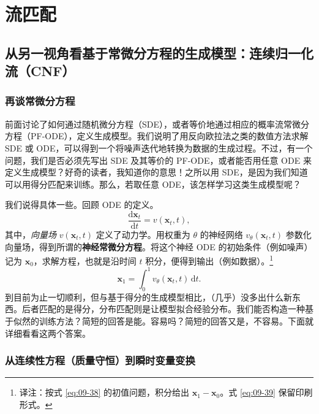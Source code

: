 \section{流匹配}
\label{sec:09-04}

\subsection[从常微分方程看连续归一化流]{从另一视角看基于常微分方程的生成模型：连续归一化流（CNF）}

\subsubsection{再谈常微分方程}

前面讨论了如何通过随机微分方程（SDE），或者等价地通过相应的概率流常微分方程（PF-ODE），定义生成模型。我们说明了用反向欧拉法之类的数值方法求解 SDE 或 ODE，可以得到一个将噪声迭代地转换为数据的生成过程。不过，有一个问题，我们是否必须先写出 SDE 及其等价的 PF-ODE，或者能否用任意 ODE 来定义生成模型？好奇的读者，我知道你的意思！之所以用 SDE，是因为我们知道可以用得分匹配来训练。那么，若取任意 ODE，该怎样学习这类生成模型呢？

我们说得具体一些。回顾 ODE 的定义。
\begin{equation}
  \frac{\mathrm d\mathbf x_t}{\mathrm dt}=v(\mathbf x_t,t),
  \tag{9.38}\label{eq:09-38}
\end{equation}
其中，\emph{向量场} $v(\mathbf x_t,t)$ 定义了动力学。用权重为 $\theta$ 的神经网络 $v_\theta(\mathbf x_t,t)$ 参数化向量场，得到所谓的\textbf{神经常微分方程}。将这个神经 ODE 的初始条件（例如噪声）记为 $\mathbf x_0$，求解方程，也就是沿时间 $t$ 积分，便得到输出（例如数据）。\footnote{译注：按式 \eqref{eq:09-38} 的初值问题，积分给出 $\mathbf x_1-\mathbf x_0$。式 \eqref{eq:09-39} 保留印刷形式。}
\begin{equation}
  \mathbf x_1=\int_0^1 v_\theta(\mathbf x_t,t)\,\mathrm dt.
  \tag{9.39}\label{eq:09-39}
\end{equation}
到目前为止一切顺利，但与基于得分的生成模型相比，（几乎）没多出什么新东西。后者匹配的是得分，分布匹配则是让模型拟合经验分布。我们能否构造一种基于似然的训练方法？简短的回答是能。容易吗？简短的回答又是，不容易。下面就详细看看这两个答案。

\subsubsection{从连续性方程（质量守恒）到瞬时变量变换}

